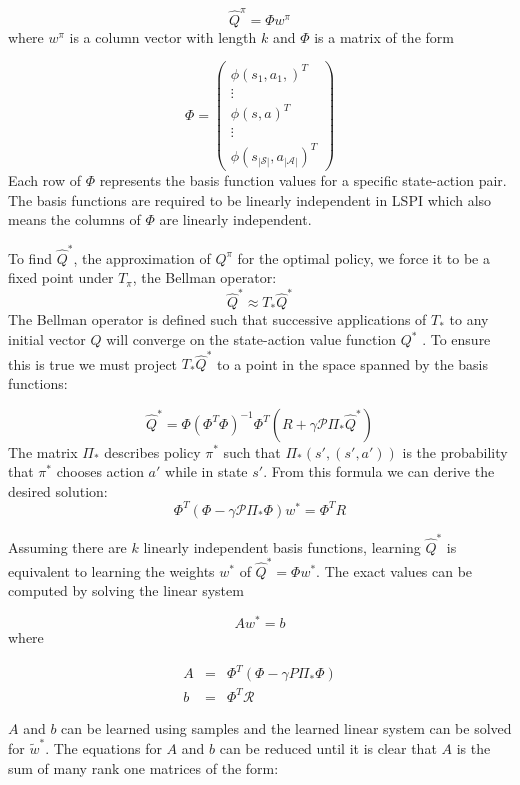 \[
    \hat{Q}^\pi = \Phi w^\pi
\]
where $w^\pi$ is a column vector with length $k$ and $\Phi$ is a matrix of the form

\[
    \Phi = \begin{pmatrix}
        \phi(s_1,a_1,)^T \\ \vdots \\ \phi(s,a)^T \\ \vdots \\ \phi(s_{|\mathcal{S}|},a_{|\mathcal{A}|})^T
    \end{pmatrix}
\]
Each row of $\Phi$ represents the basis function values for a specific state-action pair. The basis functions are required to be linearly independent in LSPI which also means the columns of $\Phi$ are linearly independent.

To find $\hat{Q}^*$, the approximation of $Q^\pi$ for the optimal policy, we force it to be a fixed point under $T_\pi$, the Bellman operator:
\[
    \hat{Q}^* \approx T_*\hat{Q}^*
\]
The Bellman operator is defined such that successive applications of $T_*$ to any initial vector $Q$ will converge on the state-action value function $Q^*$ \cite{lspi}. To ensure this is true we must project $T_*\hat{Q}^*$ to a point in the space spanned by the basis functions:

\[
    \hat{Q}^* = \Phi(\Phi^T\Phi)^{-1}\Phi^T(R + \gamma \mathcal{P}\Pi_*\hat{Q}^*)
\]
The matrix $\Pi_*$ describes policy $\pi^*$ such that $\Pi_*(s',(s',a'))$ is the probability that $\pi^*$ chooses action $a'$ while in state $s'$. From this formula we can derive the desired solution:
\[
    \Phi^T(\Phi - \gamma \mathcal{P}\Pi_*\Phi)w^* = \Phi^TR
\]

Assuming there are $k$ linearly independent basis functions, learning $\hat{Q}^*$ is equivalent to learning the weights $w^*$ of $\hat{Q}^* = \Phi w^*$. The exact values can be computed by solving the linear system

\begin{equation}
    Aw^* = b
\end{equation}
where

\[
    \begin{array}{rcl}
        A &=& \Phi^T(\Phi - \gamma P\Pi_*\Phi) \\
        b &=& \Phi^T\mathcal{R}
    \end{array}
\]

$A$ and $b$ can be learned using samples and the learned linear system can be solved for $\tilde{w}^*$. The equations for $A$ and $b$ can be reduced until it is clear that $A$ is the sum of many rank one matrices of the form:

